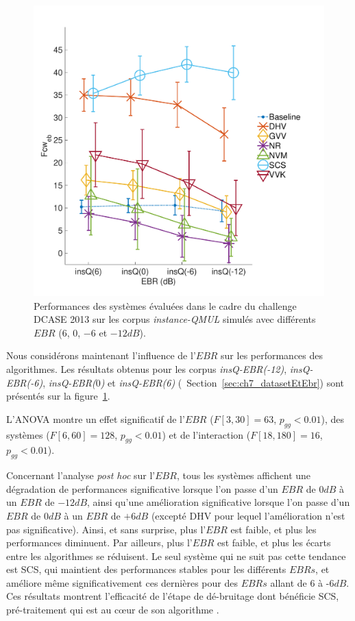 \begin{figure}[t]
\begin{center}
\includegraphics[width=1\columnwidth]{gfx/ch_7/dcase2013_2}
\caption{Performances des systèmes évaluées dans le cadre du challenge DCASE 2013 sur les corpus \emph{instance-QMUL} simulés avec différents $EBR$ ($6$, $0$, $-6$ et $-12dB$).}
\label{fig:ebr} 
\end{center}
\end{figure}

Nous considérons maintenant l'influence de l'$EBR$ sur les performances des algorithmes. Les résultats obtenus pour les corpus \emph{insQ-EBR(-12)}, \emph{insQ-EBR(-6)}, \emph{insQ-EBR($0$)} et \emph{insQ-EBR(6)} (\cf~Section~\ref{sec:ch7_datasetEtEbr}) sont présentés sur la figure~\ref{fig:ebr}. 

L'ANOVA montre un effet significatif de l'$EBR$ ($F[3,30]=63$, $p_{gg}<0.01$), des systèmes ($F[6,60]=128$, $p_{gg}<0.01$) et de l'interaction ($F[18,180]=16$, $p_{gg}<0.01$).

Concernant l'analyse \emph{post hoc} sur l'$EBR$, tous les systèmes affichent une dégradation de performances significative lorsque l'on passe d'un $EBR$ de $0dB$ à un $EBR$ de $-12dB$, ainsi qu'une amélioration significative lorsque l'on passe d'un $EBR$ de $0dB$ à un $EBR$ de $+6dB$ (excepté DHV pour lequel l'amélioration n'est pas significative). Ainsi, et sans surprise, plus l'$EBR$ est faible, et plus les performances diminuent. Par ailleurs, plus l'$EBR$ est faible, et plus les écarts entre les algorithmes se réduisent. Le seul système qui ne suit pas cette tendance est SCS, qui maintient des performances stables pour les différents $EBRs$, et améliore même significativement ces dernières pour des $EBRs$ allant de $6$ à -6$dB$. Ces résultats montrent l'efficacité de l'étape de dé-bruitage dont bénéficie SCS, pré-traitement qui est au cœur de son algorithme \citep{SCS}. \\

